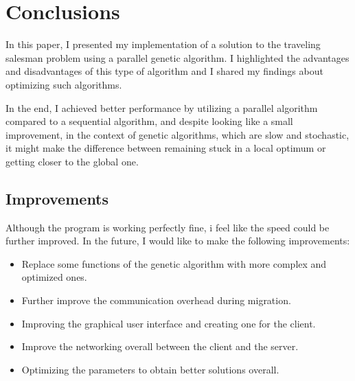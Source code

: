 \chapter*{Conclusions} 

In this paper, I presented my implementation of a solution to the traveling salesman problem using a parallel genetic algorithm. I highlighted the advantages and disadvantages of this type of algorithm and I shared my findings about optimizing such algorithms.
\par
In the end, I achieved better performance by utilizing a parallel algorithm compared to a sequential algorithm, and despite looking like a small improvement, in the context of genetic algorithms, which are slow and stochastic, it might make the difference between remaining stuck in a local optimum or getting closer to the global one.

\section*{Improvements}

Although the program is working perfectly fine, i feel like the speed could be further improved. In the future, I would like to make the following improvements:
\begin{itemize}
    \item Replace some functions of the genetic algorithm with more complex and optimized ones.
    \item Further improve the communication overhead during migration.
    \item Improving the graphical user interface and creating one for the client.
    \item Improve the networking overall between the client and the server.
    \item Optimizing the parameters to obtain better solutions overall.
\end{itemize}

